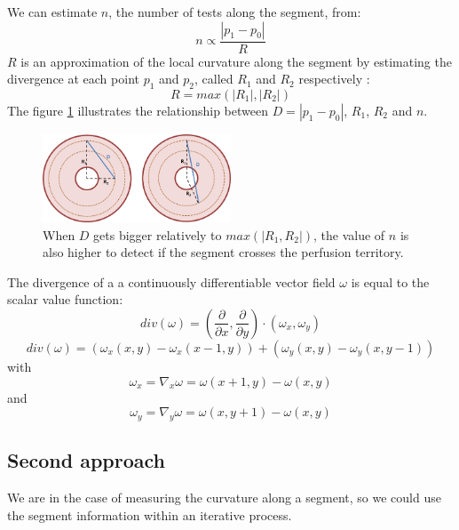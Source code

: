 \documentclass[11pt,a4paper]{article}
\begin{document}
We can estimate $n$, the number of tests along the segment, from:
\begin{equation}
n \propto \frac{|p_1 - p_0|}{R}
\end{equation}
$R$ is an approximation of the local curvature along the segment by estimating the divergence at each point $p_1$ and $p_2$, called $R_1$ and $R_2$ respectively :
\begin{equation}
R = max(|R_1|, |R_2|)
\end{equation} 
The figure \ref{example} illustrates the relationship between $D = |p_1 - p_0|$, $R_1$, $R_2$ and $n$. 
\begin{figure}[h!]
\centering
\includegraphics[width=0.5\textwidth]{Drawings/CurvatureTestExample.png}
\caption{When $D$ gets bigger relatively to $max(|R_1, R_2|)$, the value of $n$ is also higher to detect if the segment crosses the perfusion territory.}
\label{example}
\end{figure}

The divergence of a a continuously differentiable vector field $\omega$ is equal to the scalar value function:
\begin{equation}
div (\omega) = (\frac{\partial}{\partial x}, \frac{\partial}{\partial y}) \cdot (\omega_x, \omega_y) 
\end{equation}
\begin{equation}
div (\omega) = \left( \omega_x(x, y) - \omega_x(x-1, y) \right) + \left( \omega_y(x, y) - \omega_y(x, y - 1) \right)
\end{equation}
with
\begin{equation}
\omega_x = \nabla_x \omega = \omega (x + 1, y) - \omega (x, y)
\end{equation}
and
\begin{equation}
\omega_y = \nabla_y \omega = \omega (x, y + 1) - \omega (x, y)
\end{equation}	

\subsection{Second approach}

We are in the case of measuring the curvature along a segment, so we could use the segment information within an iterative process.
\end{document}
